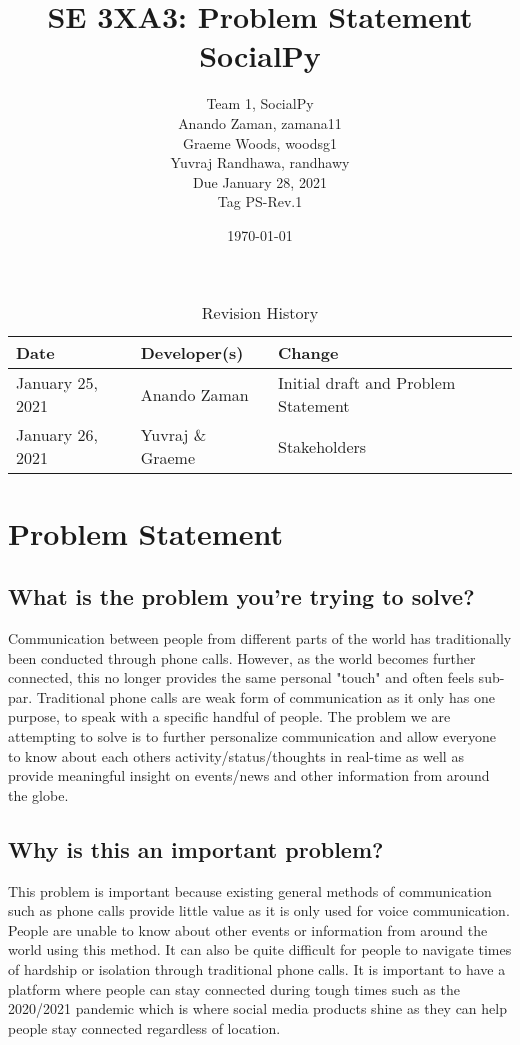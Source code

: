 \documentclass[12pt, titlepage]{article}
\title{SE 3XA3: Problem Statement\\SocialPy}
\author{
	Team 1, SocialPy
		\\ Anando Zaman, zamana11
        \\ Graeme Woods, woodsg1
        \\ Yuvraj Randhawa, randhawy
        \\ Due January 28, 2021
        \\ Tag PS-Rev.1
}
\date{\today}
\begin{document}
\maketitle

\tableofcontents
\listoftables
\listoffigures

\begin{table}[!hbp]
    \caption{Revision History} \label{RevisionHistory}
    \begin{tabularx}{\textwidth}{llX}
        \toprule
            \textbf{Date} & \textbf{Developer(s)} & \textbf{Change}\\
        \midrule
            January 25, 2021 & Anando Zaman & Initial draft and Problem Statement\\
            January 26, 2021 & Yuvraj \& Graeme & Stakeholders\\
        \bottomrule
    \end{tabularx}
\end{table}

\newpage

\maketitle

\newpage
\section{Problem Statement}
\subsection{What is the problem you're trying to solve?}
Communication between people from different parts of the world has traditionally been conducted through phone calls. However, as the world becomes further connected, this no longer provides the same personal "touch" and often feels sub-par. Traditional phone calls are weak form of communication as it only has one purpose, to speak with a specific handful of people. The problem we are attempting to solve is to further personalize communication and allow everyone to know about each others activity/status/thoughts in real-time as well as provide meaningful insight on events/news and other information from around the globe.

\subsection{Why is this an important problem?}
This problem is important because existing general methods of communication such as phone calls provide little value as it is only used for voice communication. People are unable to know about other events or information from around the world using this method. It can also be quite difficult for people to navigate times of hardship or isolation through traditional phone calls. It is important to have a platform where people can stay connected during tough times such as the 2020/2021 pandemic which is where social media products shine as they can help people stay connected regardless of location.
\end{document}
